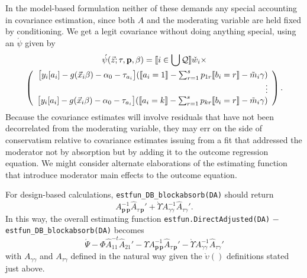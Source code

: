 \documentclass{article}
\DeclarePairedDelimiter{\indicator}{\llbracket}{\rrbracket}
\newcommand{\owt}[1][{[a_i]}]{\ensuremath{\check{w}_{i#1}}}
\newcommand{\AbsorbInterceptsEF}{\Upsilon}
\newcommand{\absorbModeratorEF}{\grave{\upsilon}}
\newcommand{\AbsorbModeratorEF}{\grave{\Upsilon}}
\begin{document}
In the model-based formulation neither of these demands any special
accounting in covariance estimation, since both $A$ and the moderating
variable are held fixed by conditioning. We get a legit covariance
without doing anything special, using an $\acute{\psi}$ given by
\begin{multline*}
  \acute{\psi}(\vec{z}; \tau, \mathbf{p}, \beta) =
    \indicator{i \in \bigcup \mathcal{Q}}\owt[] \times \\
\left(
  \begin{array}{r}
    \big[y_{i}[a_{i}]
    -
    g(\vec{x}_{i}\beta)-\alpha_{0}-\tau_{a_{i}}\big]
    (
    \indicator{a_{i}=1}-
    \sum_{r=1}^{s}p_{1r}\indicator{b_{i}=r}
    - \tilde{m}_{i}\gamma)\\
    \vdots \\
    {}\big[y_{i}[a_{i}]
    - g(\vec{x}_{i}\beta) -\alpha_{0} -
    \tau_{a_{i}}\big]
    (
    \indicator{a_{i}=k}
    -
    \sum_{r=1}^{s}p_{kr}\indicator{b_{i}=r}
    -
    \tilde{m}_{i}\gamma)\\
  \end{array}
\right) .
\end{multline*}
Because the covariance estimates will
involve residuals that have not been decorrelated from the moderating
variable, they may err on the side of conservatism relative to
covariance estimates issuing from a fit that addressed the moderator
not by absorption but by adding it to the outcome regression
equation. We might consider alternate elaborations of the estimating
function that introduce moderator main effects to the outcome equation.

For design-based calculations, \texttt{estfun\_DB\_blockabsorb(DA)}
 should return
 \begin{equation*}
   A_{\mathbf{p}\,\mathbf{p}}^{-1}\hat{A}_{\tau\,\mathbf{p}}' +
  \AbsorbModeratorEF{}A_{\gamma \gamma}^{-1}\hat{A}_{\tau \gamma}'.
 \end{equation*}
 In this way, the overall estimating function
 \texttt{estfun.DirectAdjusted(DA)} $-$ \texttt{estfun\_DB\_blockabsorb(DA)} 
 becomes
 \begin{equation}
   \label{eq:19}
  \acute{\Psi} -
  \Phi
  \hat{A}_{11}^{-t}\hat{A}_{21}' - \AbsorbInterceptsEF{}
  A_{\mathbf{p}\,\mathbf{p}}^{-1}\hat{A}_{\tau\,\mathbf{p}}' -
  \AbsorbModeratorEF{}A_{\gamma \gamma}^{-1}\hat{A}_{\tau \gamma}'
 \end{equation}
with $A_{\gamma \gamma}$ and $A_{\tau \gamma}$ defined in the natural
way given the $\absorbModeratorEF()$ definitions stated just above. 
\end{document}

